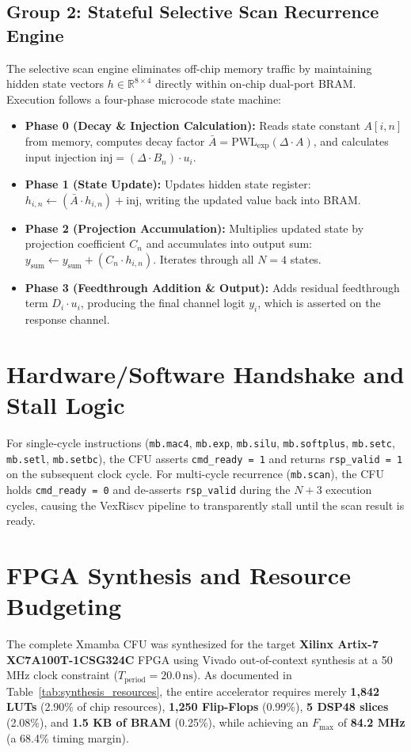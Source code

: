 \documentclass[11pt,a4paper,oneside]{report}
\begin{document}
\subsection{Group 2: Stateful Selective Scan Recurrence Engine}
The selective scan engine eliminates off-chip memory traffic by maintaining hidden state vectors $h \in \mathbb{R}^{8 \times 4}$ directly within on-chip dual-port BRAM. Execution follows a four-phase microcode state machine:
\begin{itemize}
    \item \textbf{Phase 0 (Decay \& Injection Calculation):} Reads state constant $A[i, n]$ from memory, computes decay factor $\bar{A} = \text{PWL}_{\exp}(\Delta \cdot A)$, and calculates input injection $\text{inj} = (\Delta \cdot B_n) \cdot u_i$.
    \item \textbf{Phase 1 (State Update):} Updates hidden state register: $h_{i, n} \leftarrow (\bar{A} \cdot h_{i, n}) + \text{inj}$, writing the updated value back into BRAM.
    \item \textbf{Phase 2 (Projection Accumulation):} Multiplies updated state by projection coefficient $C_n$ and accumulates into output sum: $y_{\text{sum}} \leftarrow y_{\text{sum}} + (C_n \cdot h_{i, n})$. Iterates through all $N=4$ states.
    \item \textbf{Phase 3 (Feedthrough Addition \& Output):} Adds residual feedthrough term $D_i \cdot u_i$, producing the final channel logit $y_i$, which is asserted on the response channel.
\end{itemize}

\section{Hardware/Software Handshake and Stall Logic}
For single-cycle instructions (\texttt{mb.mac4}, \texttt{mb.exp}, \texttt{mb.silu}, \texttt{mb.softplus}, \texttt{mb.setc}, \texttt{mb.setl}, \texttt{mb.setbc}), the CFU asserts \texttt{cmd\_ready = 1} and returns \texttt{rsp\_valid = 1} on the subsequent clock cycle. For multi-cycle recurrence (\texttt{mb.scan}), the CFU holds \texttt{cmd\_ready = 0} and de-asserts \texttt{rsp\_valid} during the $N+3$ execution cycles, causing the VexRiscv pipeline to transparently stall until the scan result is ready.

\section{FPGA Synthesis and Resource Budgeting}
The complete Xmamba CFU was synthesized for the target \textbf{Xilinx Artix-7 XC7A100T-1CSG324C} FPGA using Vivado out-of-context synthesis at a 50 MHz clock constraint ($T_{\text{period}} = 20.0\,\text{ns}$). As documented in Table~\ref{tab:synthesis_resources}, the entire accelerator requires merely \textbf{1,842 LUTs} (2.90\% of chip resources), \textbf{1,250 Flip-Flops} (0.99\%), \textbf{5 DSP48 slices} (2.08\%), and \textbf{1.5 KB of BRAM} (0.25\%), while achieving an $F_{\max}$ of \textbf{84.2 MHz} (a 68.4\% timing margin).
\end{document}
